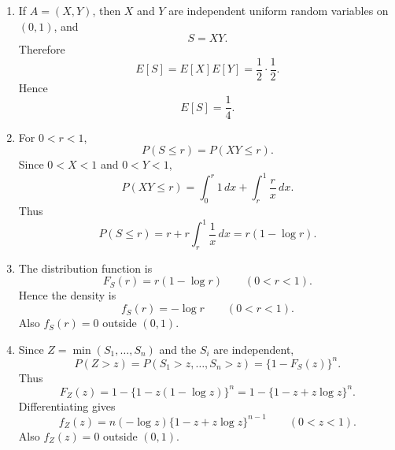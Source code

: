 \documentclass[10pt,a4paper]{article}
\begin{document}
\begin{enumerate}
  \item If $A=(X,Y)$, then $X$ and $Y$ are independent uniform random variables on $(0,1)$, and
        \[
          S=XY.
        \]
        Therefore
        \[
          E[S]=E[X]E[Y]=\frac12\cdot\frac12.
        \]
        Hence
        \[
          \boxed{E[S]=\frac14.}
        \]

  \item For $0<r<1$,
        \[
          P(S\leq r)
          =
          P(XY\leq r).
        \]
        Since $0<X<1$ and $0<Y<1$,
        \[
          P(XY\leq r)
          =
          \int_0^r1\,dx+\int_r^1\frac{r}{x}\,dx.
        \]
        Thus
        \[
          P(S\leq r)
          =
          r+r\int_r^1\frac{1}{x}\,dx
          =
          \boxed{r(1-\log r).}
        \]

  \item The distribution function is
        \[
          F_S(r)=r(1-\log r)
          \qquad (0<r<1).
        \]
        Hence the density is
        \[
          \boxed{
          f_S(r)=-\log r
          \qquad (0<r<1).}
        \]
        Also $f_S(r)=0$ outside $(0,1)$.

  \item Since $Z=\min(S_1,\ldots,S_n)$ and the $S_i$ are independent,
        \[
          P(Z>z)=P(S_1>z,\ldots,S_n>z)
          =
          \{1-F_S(z)\}^n.
        \]
        Thus
        \[
          F_Z(z)=1-\{1-z(1-\log z)\}^n
          =
          1-\{1-z+z\log z\}^n.
        \]
        Differentiating gives
        \[
          \boxed{
          f_Z(z)=
          n(-\log z)\{1-z+z\log z\}^{n-1}
          \qquad (0<z<1).}
        \]
        Also $f_Z(z)=0$ outside $(0,1)$.
\end{enumerate}
\end{document}
